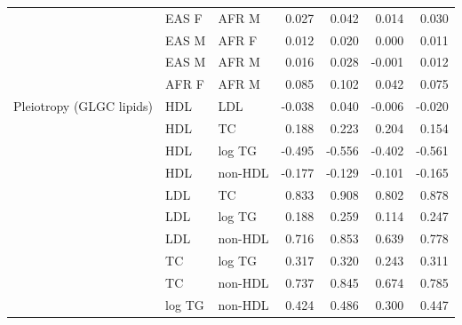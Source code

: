 {\begin{longtable}{lll rrrr}
 & EAS F & AFR M & 0.027 & 0.042 & 0.014 & 0.030\\
 & EAS M & AFR F & 0.012 & 0.020 & 0.000 & 0.011\\
 & EAS M & AFR M & 0.016 & 0.028 & -0.001 & 0.012\\
 & AFR F & AFR M & 0.085 & 0.102 & 0.042 & 0.075\\
\midrule
Pleiotropy (GLGC lipids) & HDL & LDL & -0.038 & 0.040 & -0.006 & -0.020\\
 & HDL & TC & 0.188 & 0.223 & 0.204 & 0.154\\
 & HDL & log TG & -0.495 & -0.556 & -0.402 & -0.561\\
 & HDL & non-HDL & -0.177 & -0.129 & -0.101 & -0.165\\
 & LDL & TC & 0.833 & 0.908 & 0.802 & 0.878\\
 & LDL & log TG & 0.188 & 0.259 & 0.114 & 0.247\\
 & LDL & non-HDL & 0.716 & 0.853 & 0.639 & 0.778\\
 & TC & log TG & 0.317 & 0.320 & 0.243 & 0.311\\
 & TC & non-HDL & 0.737 & 0.845 & 0.674 & 0.785\\
 & log TG & non-HDL & 0.424 & 0.486 & 0.300 & 0.447\\
\end{longtable}}
